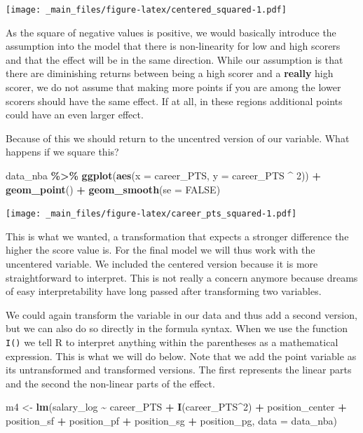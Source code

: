 \documentclass[
]{book}
\newenvironment{Shaded}{\begin{snugshade}}{\end{snugshade}}
\newcommand{\AttributeTok}[1]{\textcolor[rgb]{0.13,0.29,0.53}{#1}}
\newcommand{\ConstantTok}[1]{\textcolor[rgb]{0.56,0.35,0.01}{#1}}
\newcommand{\DecValTok}[1]{\textcolor[rgb]{0.00,0.00,0.81}{#1}}
\newcommand{\FunctionTok}[1]{\textcolor[rgb]{0.13,0.29,0.53}{\textbf{#1}}}
\newcommand{\NormalTok}[1]{#1}
\newcommand{\OtherTok}[1]{\textcolor[rgb]{0.56,0.35,0.01}{#1}}
\newcommand{\SpecialCharTok}[1]{\textcolor[rgb]{0.81,0.36,0.00}{\textbf{#1}}}
\begin{document}
\texttt{[image: \_main\_files/figure-latex/centered\_squared-1.pdf]}

As the square of negative values is positive, we would basically
introduce the assumption into the model that there is non-linearity for
low and high scorers and that the effect will be in the same direction.
While our assumption is that there are diminishing returns between being
a high scorer and a \textbf{really} high scorer, we do not assume that making
more points if you are among the lower scorers should have the same
effect. If at all, in these regions additional points could have an even
larger effect.

Because of this we should return to the uncentred version of our
variable. What happens if we square this?

\begin{Shaded}
\begin{Highlighting}[]
\NormalTok{data\_nba }\SpecialCharTok{\%\textgreater{}\%} 
  \FunctionTok{ggplot}\NormalTok{(}\FunctionTok{aes}\NormalTok{(}\AttributeTok{x =}\NormalTok{ career\_PTS, }\AttributeTok{y =}\NormalTok{ career\_PTS }\SpecialCharTok{\^{}} \DecValTok{2}\NormalTok{)) }\SpecialCharTok{+}
  \FunctionTok{geom\_point}\NormalTok{() }\SpecialCharTok{+}
  \FunctionTok{geom\_smooth}\NormalTok{(}\AttributeTok{se =} \ConstantTok{FALSE}\NormalTok{)}
\end{Highlighting}
\end{Shaded}

\texttt{[image: \_main\_files/figure-latex/career\_pts\_squared-1.pdf]}

This is what we wanted, a transformation that expects a stronger
difference the higher the score value is. For the final model we will
thus work with the uncentered variable. We included the centered version
because it is more straightforward to interpret. This is not really a
concern anymore because dreams of easy interpretability have long passed
after transforming two variables.

We could again transform the variable in our data and thus add a second
version, but we can also do so directly in the formula syntax. When we
use the function \texttt{I()} we tell R to interpret anything within the
parentheses as a mathematical expression. This is what we will do below.
Note that we add the point variable as its untransformed and transformed
versions. The first represents the linear parts and the second the
non-linear parts of the effect.

\begin{Shaded}
\begin{Highlighting}[]
\NormalTok{m4 }\OtherTok{\textless{}{-}} \FunctionTok{lm}\NormalTok{(salary\_log }\SpecialCharTok{\textasciitilde{}}\NormalTok{ career\_PTS }\SpecialCharTok{+} \FunctionTok{I}\NormalTok{(career\_PTS}\SpecialCharTok{\^{}}\DecValTok{2}\NormalTok{) }\SpecialCharTok{+}\NormalTok{ position\_center }\SpecialCharTok{+}\NormalTok{ position\_sf }\SpecialCharTok{+}\NormalTok{ position\_pf }\SpecialCharTok{+}\NormalTok{ position\_sg }\SpecialCharTok{+}\NormalTok{ position\_pg, }\AttributeTok{data =}\NormalTok{ data\_nba)}
\end{Highlighting}
\end{Shaded}
\end{document}
